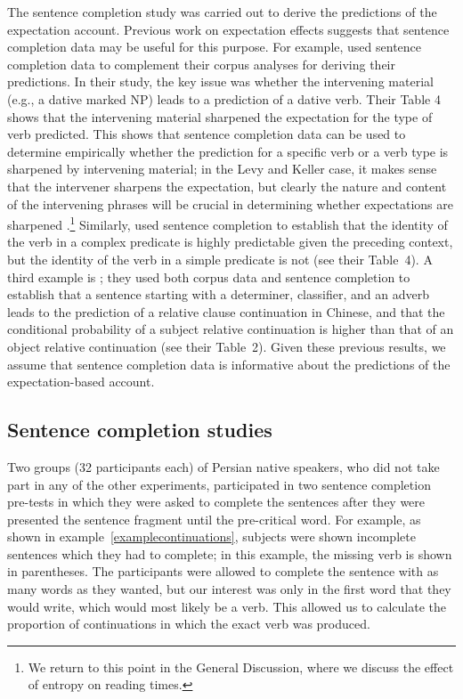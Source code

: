 \documentclass{frontiersSCNS}\usepackage{knitr} %
\begin{document}
The sentence completion study was carried out to derive the predictions of the expectation account. Previous work on expectation effects suggests that sentence completion data may be useful for this purpose. For example, \citet{levy2013expectation} used sentence completion data to complement their corpus analyses for deriving their predictions. In their study, the key issue was whether the intervening material (e.g., a dative marked NP) leads to a prediction of a dative verb. Their Table 4 shows that the intervening material sharpened the expectation for the type of verb predicted. This shows that sentence completion data can be used to determine empirically whether the prediction for a specific verb or a verb type is sharpened by intervening material; in the Levy and Keller case, it makes sense that the intervener sharpens the expectation, but clearly the nature and content of the intervening phrases will be crucial in determining whether expectations are sharpened \citep{konieczny2000locality,grodner2005consequences}.\footnote{We return to this point in the General Discussion, where we discuss the effect of entropy on reading times.}
Similarly, \citet{husain2014strong} used sentence completion to establish that the identity of the verb in a complex predicate is highly predictable given the preceding context, but the identity of the verb in a simple predicate is not (see their Table~4). A third example is  
\citet{Jaegeretal2015}; they used both corpus data and sentence completion to establish that a sentence starting with a determiner, classifier, and an adverb leads to the prediction of a relative clause continuation in Chinese, and that the conditional probability of a subject relative continuation is higher than that of an object relative continuation (see their Table~2). 
Given these previous results, we assume that sentence completion data is informative about the predictions of the expectation-based account.

\subsection{Sentence completion studies}

Two groups (32 participants each) of Persian native speakers, who did not take part in any of the other experiments, participated in two sentence completion pre-tests in which they were asked to complete the sentences after they were presented the sentence fragment until the pre-critical word.  For example, as shown in example~\ref{examplecontinuations}, subjects were shown incomplete sentences which they had to complete; in this example, the missing verb is shown in parentheses. The participants were allowed to complete the sentence with as many words as they wanted, but our interest was only in the first word that they would write, which would most likely be a verb.
This allowed us to calculate the proportion of continuations in which the exact verb was produced.
\end{document}

